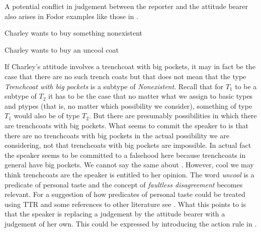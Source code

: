 A potential conflict in judgement between the reporter and
the attitude bearer also arises in Fodor examples like those in
\nexteg{}.
\begin{ex} 
\begin{subex} 
 
\item Charley wants to buy something nonexistent 
 
\item Charley wants to buy an uncool coat 
 
\end{subex} 
   
\end{ex} 
If Charley's attitude involves a trenchcoat with big pockets, it may
in fact be the case that there are no such trench coats but that does
not mean that the type \textit{Trenchcoat with big pockets} is a
subtype of \textit{Nonexistent}.  Recall that for $T_1$ to be a
subtype of $T_2$ it has to be the case that no matter what we assign
to basic types and ptypes (that is, no matter which possibility we
consider), something of type $T_1$ would also be of
type $T_2$.  But there are presumably possibilities in which there are
trenchcoats with big pockets.  What  seems to commit the
speaker to is that there are no trenchcoats with big pockets in the
actual possibility we are considering, not that trenchcoats with big
pockets are impossible.  In actual fact the speaker seems to be
committed to a falsehood here because trenchcoats in general have big
pockets.  We cannot say the same about .  However, cool we
may think trenchcoats are the speaker is entitled to her opinion.  The
word \textit{uncool} is a predicate of personal taste and the concept
of \textit{faultless disagreement} \citep{Koelbel2004} becomes
relevant.  For a suggestion of how predicates of personal taste
could be treated using TTR and some references to other literature see
\cite{Cooper2015a}.  What this points to is that the speaker is
replacing a judgement by the attitude bearer with a judgement of her
own.  This could be expressed by introducing the action rule in \nexteg{}.
\begin{ex}
  \begin{prooftree}
  \end{prooftree}
  

\label{ex:pov-constr} 
\end{ex} 
